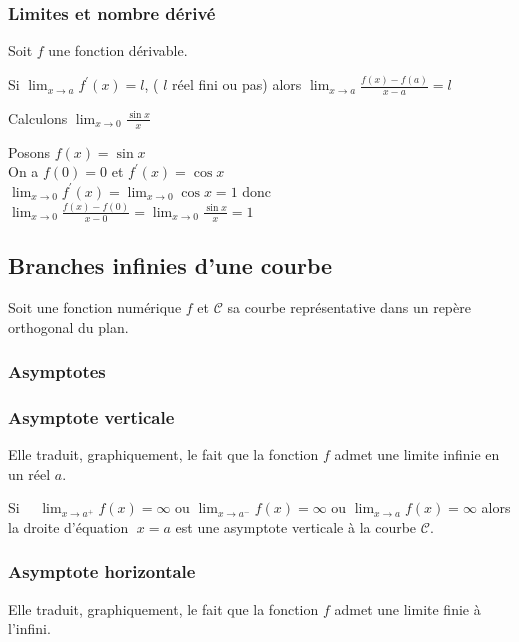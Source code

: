 \subsubsection*{Limites et nombre dérivé}

\begin{theorem}
Soit $ f $ une fonction dérivable.

Si $\displaystyle \lim_{x \to a}f^{'}(x)=l$,\;  ( $l$ réel fini ou pas) alors $\displaystyle\lim_{x \to a} \frac{f(x)-f(a)}{x-a}=l$
\end{theorem}

\begin{example}
Calculons $\displaystyle\lim_{x \to 0}\frac{\sin x}{x} $

Posons $ f(x)=\sin x $\\
On a $ f(0)=0 $ et  $ f^{'}(x)=\cos x$\\
 $ \displaystyle\lim_{x \to 0}f^{'}(x)=\displaystyle\lim_{x \to 0}\cos x=1 $ donc $\displaystyle \lim_{x \to 0} \frac{f(x)-f(0)}{x-0}=\displaystyle \lim_{x \to 0}\frac{\sin x}{x}=1$
\end{example}

\subsection{Branches infinies d'une courbe}
Soit une fonction numérique $ f $ et $ \mathcal{C} $ sa courbe représentative dans un repère orthogonal du plan.
\subsubsection{Asymptotes}
\subsubsection*{Asymptote verticale}
Elle traduit, graphiquement, le fait que la fonction $f$ admet une limite infinie en un réel $a$.


\begin{definition}
Si $\quad \displaystyle\lim_{x \to a^{+}}f(x)=\infty$  ou 
$\displaystyle\lim_{x \to a^{-}}f(x)=\infty $  ou 
$\displaystyle\lim_{x \to a}f(x)=\infty $ alors  la droite  d'équation $\; x=a$ est une asymptote verticale à la courbe $\mathcal{C} $.
\end{definition}



\subsubsection*{Asymptote horizontale}
Elle traduit, graphiquement, le fait que la fonction $f$ admet une limite finie à l'infini.



